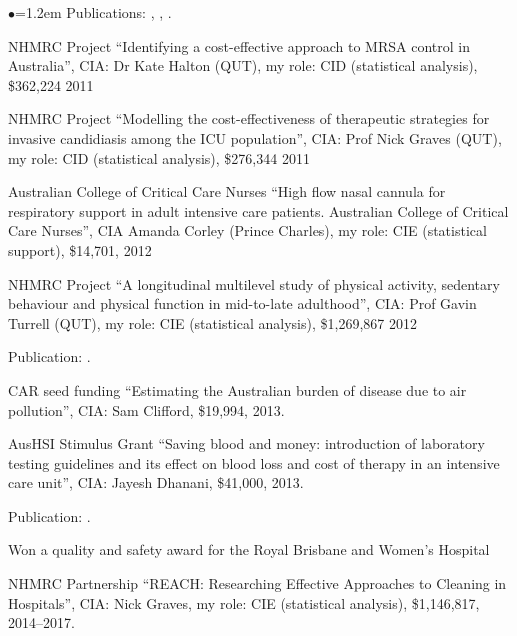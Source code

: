 \documentclass[a4paper,11pt]{article}
\renewcommand{\labelitemi}{$\bullet$}
\begin{document}
\begin{raggedright}
\begin{list}{\labelitemi}{\leftmargin=1.2em}
    Publications: , , .

\item NHMRC Project ``Identifying a cost-effective approach to MRSA control in Australia'', CIA: Dr Kate Halton (QUT), my role: CID (statistical analysis), \$362,224 2011

\item NHMRC Project ``Modelling the cost-effectiveness of therapeutic strategies for invasive candidiasis among the ICU population'', CIA: Prof Nick Graves (QUT), my role: CID (statistical analysis), \$276,344 2011

\item Australian College of Critical Care Nurses ``High flow nasal cannula for respiratory support in adult intensive care patients. Australian College of Critical Care Nurses'', CIA Amanda Corley (Prince Charles), my role: CIE (statistical support), \$14,701, 2012


\item NHMRC Project ``A longitudinal multilevel study of physical activity, sedentary behaviour and physical function in mid-to-late adulthood'', CIA: Prof Gavin Turrell (QUT), my role: CIE (statistical analysis), \$1,269,867 2012

Publication: .

\item CAR seed funding ``Estimating the Australian burden of disease due to air pollution'', CIA: Sam Clifford, \$19,994, 2013.

\item AusHSI Stimulus Grant ``Saving blood and money: introduction of laboratory testing guidelines and its effect on blood loss and cost of therapy in an intensive care unit'', CIA: Jayesh Dhanani, \$41,000, 2013.

Publication: .

Won a quality and safety award for the Royal Brisbane and Women's Hospital

\item NHMRC Partnership ``REACH: Researching Effective Approaches to Cleaning in Hospitals'', CIA: Nick Graves, my role: CIE (statistical analysis), \$1,146,817, 2014--2017.


\end{list}
\end{raggedright}
\end{document}
